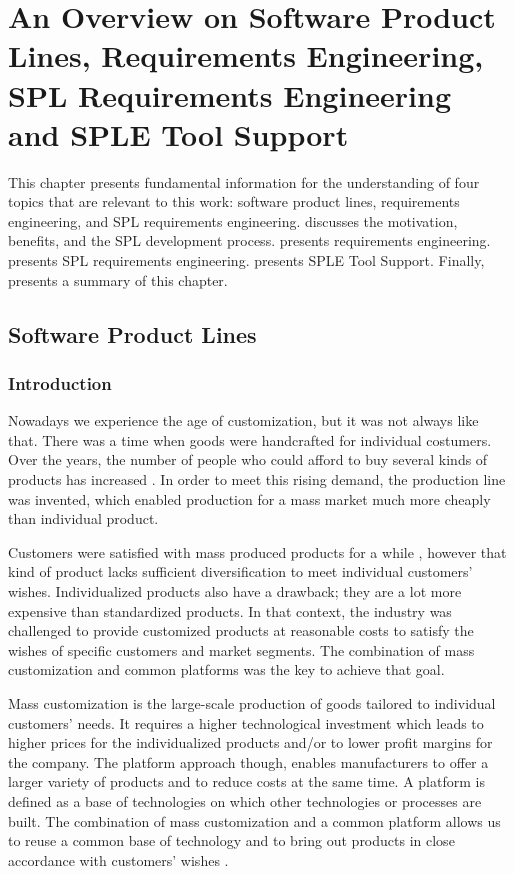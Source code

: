 \chapter{An Overview on Software Product Lines, Requirements Engineering, SPL
Requirements Engineering and SPLE Tool Support}
\label{ch:background}


This chapter presents fundamental information for the understanding of four
topics that are relevant to this work: software product lines, requirements
engineering, and \ac{SPL} requirements engineering.  discusses the
motivation, benefits, and the SPL development process.
 presents requirements engineering.
 presents \ac{SPL} requirements engineering.
 presents \ac{SPLE} Tool Support. Finally,
 presents a summary of this chapter.


\section{Software Product Lines}
\label{sc:productlines}

\subsection{Introduction}
Nowadays we experience the age of customization, but it was not always like
that. There was a time when goods were handcrafted for individual costumers. 
Over the years, the number of people who could afford to buy several kinds of 
products has increased \citep{Pohl2005}. In order to meet this rising demand, 
the production line was invented, which enabled production for a mass market much 
more cheaply than individual product.

Customers were satisfied with mass produced products for a while \citep{Pohl2005}, 
however that kind of product lacks sufficient diversification to meet individual
customers’ wishes. Individualized products also have a drawback; they are a lot more expensive 
than standardized products. In that context, the industry was challenged to provide customized 
products at reasonable costs to satisfy the wishes of specific customers and market segments. 
The combination of mass customization and common platforms was the key to achieve that goal.

Mass customization is the large-scale production of goods tailored to individual
customers’ needs. It requires a higher technological investment which leads to higher prices for 
the individualized products and/or to lower profit margins for the company. The platform approach 
though, enables manufacturers to offer a larger variety of products and to reduce costs at the same 
time. A platform is defined as a base of technologies on which other technologies or processes are 
built. The combination of mass customization and a common platform allows us to reuse a common 
base of technology and to bring out products in close accordance with customers’ wishes \citep{Pohl2005}.

